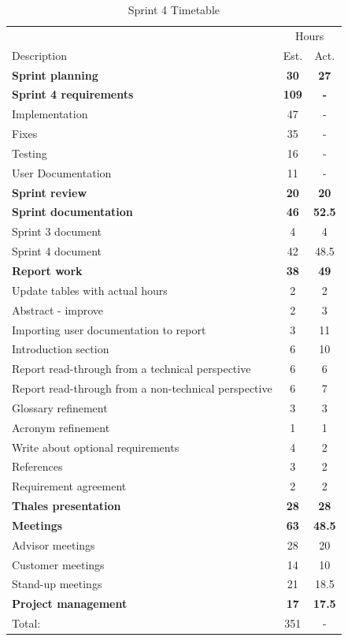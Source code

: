 \begin{table}[!htb] \small \center
\caption{Sprint 4 Timetable\label{tab:sprint4time}}
\begin{tabularx}{\textwidth}{X c c}
	\toprule
	& \multicolumn{2}{c}{Hours} \\
	\cmidrule(r){2-3}
	Description & Est. & Act. \\
	\midrule
	\textbf{Sprint planning} & \textbf{30} & \textbf{27} \\
	\addlinespace
	\textbf{Sprint 4 requirements} & \textbf{109} & \textbf{-} \\
	Implementation & 47 & - \\
	Fixes & 35 & - \\
	Testing & 16 & - \\
	User Documentation & 11 & - \\
	\addlinespace
	\textbf{Sprint review} & \textbf{20} & \textbf{20} \\
	\addlinespace
	\textbf{Sprint documentation} & \textbf{46} & \textbf{52.5} \\
	Sprint 3 document & 4 & 4 \\
	Sprint 4 document & 42 & 48.5 \\
	\addlinespace
	\textbf{Report work} & \textbf{38} & \textbf{49} \\
	Update tables with actual hours & 2 & 2 \\
	Abstract - improve & 2 & 3\\
	Importing user documentation to report & 3 & 11 \\
	Introduction section & 6 & 10 \\
	Report read-through from a technical perspective & 6 & 6\\
	Report read-through from a non-technical perspective & 6 & 7\\
	Glossary refinement & 3 & 3\\
	Acronym refinement & 1 & 1\\
	Write about optional requirements & 4 & 2\\
	References & 3 & 2\\
	Requirement agreement & 2 & 2\\
	\addlinespace
	\textbf{Thales presentation} & \textbf{28} & \textbf{28} \\
	\addlinespace
	\textbf{Meetings} & \textbf{63} & \textbf{48.5} \\
	Advisor meetings & 28 & 20 \\
	Customer meetings & 14 & 10 \\
	Stand-up meetings & 21 & 18.5 \\
	\addlinespace
	\textbf{Project management} & \textbf{17} & \textbf{17.5} \\
	\midrule
	Total: & 351 & - \\
	\bottomrule
\end{tabularx}
\end{table}

